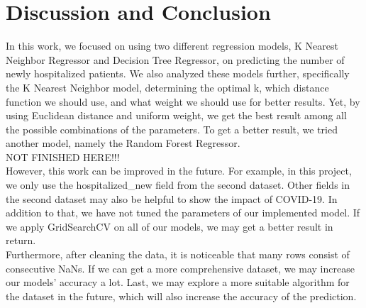 \documentclass[journal,11pt]{IEEEtran}
\begin{document}
\section{Discussion and Conclusion}
In this work, we focused on using two different regression models, K Nearest Neighbor Regressor and Decision Tree Regressor, on predicting the number of newly hospitalized patients. We also analyzed these models further, specifically the K Nearest Neighbor model, determining the optimal k, which distance function we should use, and what weight we should use for better results. Yet, by using Euclidean distance and uniform weight, we get the best result among all the possible combinations of the parameters. To get a better result, we tried another model, namely the Random Forest Regressor. 
 \\NOT FINISHED HERE!!!\\
\indent However, this work can be improved in the future. For example, in this project, we only use the hospitalized\_new field from the second dataset. Other fields in the second dataset may also be helpful to show the impact of COVID-19. In addition to that, we have not tuned the parameters of our implemented model. If we apply GridSearchCV on all of our models, we may get a better result in return.\\
Furthermore, after cleaning the data, it is noticeable that many rows consist of consecutive NaNs. If we can get a more comprehensive dataset, we may increase our models' accuracy a lot. Last, we may explore a more suitable algorithm for the dataset in the future, which will also increase the accuracy of the prediction.


%
\end{document}
